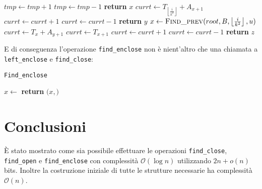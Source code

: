 \documentclass{article}
\begin{document}
    \begin{algorithm}[H]
    \begin{algorithmic}[1]
                \State $tmp\gets tmp+1$
            \Else  
                \State $tmp\gets tmp-1$
            \EndIf
                \State \textbf{return} $x$
            \EndIf
        \EndFor
        \State
                \State $currt\gets T_{\left\lfloor{\frac{i}{k^2}}\right\rfloor}+A_{x+1}$
                        \State $currt\gets currt+1$
                    \EndIf
                        \State $currt\gets currt-1$
                    \EndIf
                        \State \textbf{return} $y$
                    \EndIf
                \EndFor
            \EndIf
        \EndFor
        \State
        \State $x\gets \Call{Find\_prev}{root,B,\left\lfloor{\frac{i}{k^2}}\right\rfloor,u}$ 
                    \State $currt\gets T_x+A_{y+1}$
                \Else
                    \State $currt\gets T_{x+1}$
                \EndIf
                        \State $currt\gets currt+1$
                    \EndIf
                        \State $currt\gets currt-1$
                    \EndIf
                        \State \textbf{return} $z$
                    \EndIf
                \EndFor
            \EndIf
        \EndFor
    \EndProcedure
    \end{algorithmic}
    \end{algorithm}
E di conseguenza l'operazione \texttt{find\_enclose} non è nient'altro che una chiamata a \texttt{left\_enclose} e \texttt{find\_close}:
    \begin{algorithm}[H]
    \caption{\texttt{Find\_enclose}}\label{findenclose}
    \begin{algorithmic}[1]
    \State $x\gets$ 
    \State \textbf{return} $(x,$$)$
    \EndProcedure
    \end{algorithmic}
    \end{algorithm}
\section{Conclusioni}
È stato mostrato come sia possibile effettuare le operazioni \texttt{find\_close}, \texttt{find\_open} e \texttt{find\_enclose} con complessità $\mathcal{O}(\log{n})$ utilizzando $2n+o(n)$ bits. Inoltre la costruzione iniziale di tutte le strutture necessarie ha complessità $\mathcal{O}(n)$.
\end{document}
